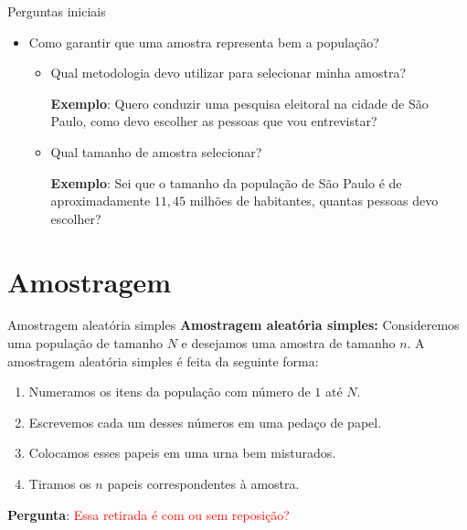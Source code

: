 \begin{frame}{Perguntas iniciais}
\begin{itemize}
    \item Como garantir que uma amostra representa bem a população?
    \begin{itemize}
        \item Qual metodologia devo utilizar para selecionar minha amostra?
        
        \textbf{Exemplo}: Quero conduzir uma pesquisa eleitoral na cidade de São Paulo, como devo escolher as pessoas que vou entrevistar?
        \pause
        \item Qual tamanho de amostra selecionar?
        
        \textbf{Exemplo}: Sei que o tamanho da população de São Paulo é de aproximadamente $11,45$ milhões de habitantes, quantas pessoas devo escolher? 
    \end{itemize}
\end{itemize}
\end{frame}

\section{Amostragem}

\begin{frame}{Amostragem aleatória simples}
    \textbf{Amostragem aleatória simples:} Consideremos uma população de tamanho $N$ e desejamos uma amostra de tamanho $n$.
    A amostragem aleatória simples é feita da seguinte forma:
    \begin{enumerate}
        \item Numeramos os itens da população com número de $1$ até $N$.
        \pause
        \item Escrevemos cada um desses números em uma pedaço de papel.
        \pause
        \item Colocamos esses papeis em uma urna bem misturados.
        \pause
        \item Tiramos os $n$ papeis correspondentes à amostra. 
    \end{enumerate}
         \pause
\textbf{Pergunta}: \textcolor{red}{Essa retirada é com ou sem reposição?}   
\end{frame}

